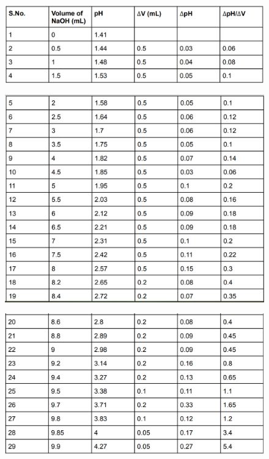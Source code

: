 \documentclass[12pt]{article}
\begin{document}
	\begin{figure}[H]
		\centering
		\includegraphics[scale=0.7]{table1}
	\end{figure}
	\begin{figure}[H]
		\centering
		\includegraphics[scale=0.7]{table2}
	\end{figure}
	\begin{figure}[H]
		\centering
		\includegraphics[scale=0.7]{table3}
	\end{figure}
\end{document}
